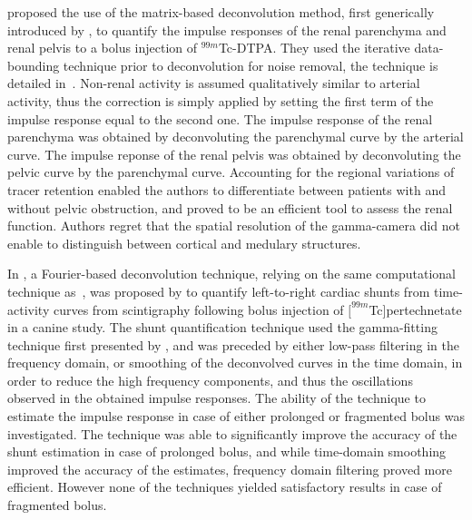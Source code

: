 \citet{Diffey:1976tk} proposed the use of the matrix-based deconvolution method, first generically introduced by \citet{Valentinuzzi:1975tr}, to quantify the impulse responses of the renal parenchyma and renal pelvis to a bolus injection of $^{99m}$Tc-DTPA. 
They used the iterative data-bounding technique prior to deconvolution for noise removal, the technique is detailed in~\cite{Diffey:1976bf}.
Non-renal activity is assumed qualitatively similar to arterial activity, thus the correction is simply applied by setting the first term of the impulse response equal to the second one.
The impulse response of the renal parenchyma was obtained by deconvoluting the parenchymal curve by the arterial curve.
The impulse reponse of the renal pelvis was obtained by deconvoluting the pelvic curve by the parenchymal curve.
Accounting for the regional variations of tracer retention enabled the authors to differentiate between patients with and without pelvic obstruction, and proved to be an efficient tool to assess the renal function.
Authors regret that the spatial resolution of the gamma-camera did not enable to distinguish between cortical and medulary structures.

In \citeyear{Alderson:1979ts}, a Fourier-based deconvolution technique, relying on the same computational technique as~\cite{Coulam:1966un}, was proposed by \citet{Alderson:1979ts} to quantify left-to-right cardiac shunts from time-activity curves from scintigraphy following bolus injection of $[^{99m}$Tc]pertechnetate in a canine study. 
The shunt quantification technique used the gamma-fitting technique first presented by \citet{Maltz:1973jj}, and was preceded by either low-pass filtering in the frequency domain, or smoothing of the deconvolved curves in the time domain, in order to reduce the high frequency components, and thus the oscillations observed in the obtained impulse responses.
The ability of the technique to estimate the impulse response in case of either prolonged or fragmented bolus was investigated.
The technique was able to significantly improve the accuracy of the shunt estimation in case of prolonged bolus, and while time-domain smoothing improved the accuracy of the estimates, frequency domain filtering proved more efficient.
However none of the techniques yielded satisfactory results in case of fragmented bolus.

